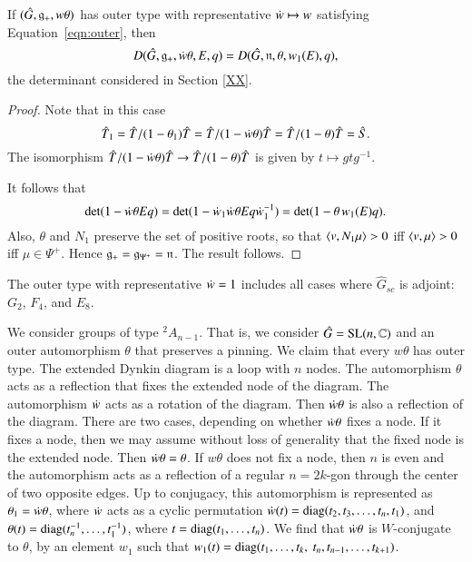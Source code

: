 \begin{lemma} If $(\hat G,{\mathfrak g}_+,w\theta)$ has outer type with representative $\dot w\mapsto w$ satisfying Equation~\ref{eqn:outer}, then
\[
D(\hat G,{\mathfrak g}_+,\dot w\theta,E,q) = D(\hat G,{\mathfrak n},\theta,w_1(E),q),
\]
the  determinant considered in Section \ref{XX}.
\end{lemma}

\begin{proof}
Note that in this case
\[
\hat T_1 = \hat T/(1-\theta_1) \hat T = \hat T/(1-\dot w \theta)\hat T = \hat T/(1-\theta)\hat T = \hat S.
\]
The isomorphism $\hat T/(1-\dot w \theta)\hat T\to \hat T/(1-\theta)\hat T$ is given by $t \mapsto g t g^{-1}$.


It follows that 
\[
\det(1- \dot w \theta E q) = \det(1 - \dot w_1 \dot w\theta E q \dot w_1^{-1}) = \det(1 - \theta\, w_1(E) q).
\]
Also, $\theta$ and $N_1$ preserve the set of positive roots, so that $\langle{v,N_1\mu}\rangle>0$ iff $\langle{v,\mu}\rangle>0$ iff $\mu\in \Psi^+$.
Hence ${\mathfrak g}_+ = {\mathfrak g}_{\Psi^+} = {\mathfrak n}$.  The result follows.
\end{proof}



The outer type with representative $\dot w = 1$  includes all cases where $\hat G_{sc}$ is adjoint: $G_2$, $F_4$, and $E_8$.

We consider groups of type ${}^2A_{n-1}$.  That is, we consider $\hat G = {\operatorname{SL}}(n,\mathbb{C})$ and an outer automorphism $\theta$ that
preserves a pinning.
We claim that every $w\theta$  has outer type.
The extended Dynkin diagram is a loop with $n$ nodes.  The automorphism $\theta$ acts as a reflection that fixes
the extended node of the diagram.  The automorphism $\dot w$ acts as a rotation of the diagram.  Then $\dot w \theta$ is also
a reflection of the diagram.  There are two cases, depending on whether $\dot w\theta$  fixes a node.  If it fixes a node,
then we may assume without loss of generality that the fixed node is the extended node.  Then $\dot w\theta = \theta$.
If $w\theta$ does not fix a node, then $n$ is even and the automorphism acts as a reflection of a regular $n=2k$-gon
through the center of two opposite edges.  Up to conjugacy, this automorphism is represented as $\theta_1 = \dot w\theta$, where
$\dot w $ acts as a cyclic permutation $\dot w (t) = {\operatorname{diag}}(t_2,t_3,\ldots,t_n,t_1)$, and $\theta(t) = {\operatorname{diag}}(t_n^{-1},\ldots,t_1^{-1})$,
where $t={\operatorname{diag}}(t_1,\ldots,t_n)$.  We find that $\dot w \theta$ is $W$-conjugate to $\theta$,
by an element $w_1$ such that $w_1(t) = \op{diag}(t_1,\ldots,t_k,\ t_n,t_{n-1},\ldots,t_{k+1})$.




